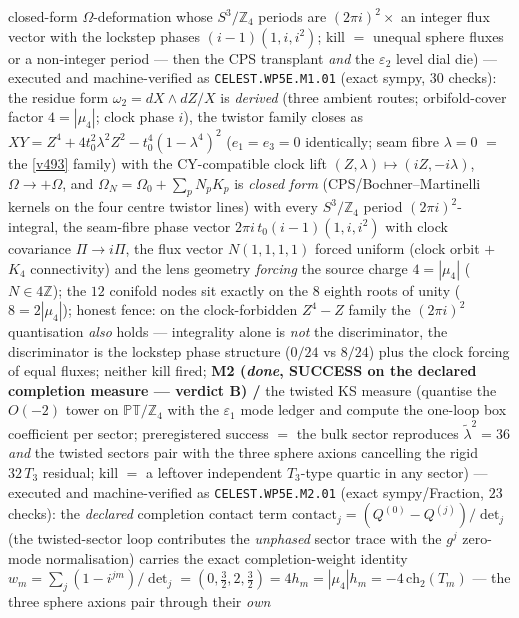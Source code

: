 \documentclass[11pt,a4paper]{article}
\newcommand{\Z}{\mathbb Z}
\begin{document}
\begin{itemize}
\begin{itemize}
closed-form $\Omega$-deformation whose $S^3/\Z_4$ periods are $(2\pi i)^2\times$ an integer flux
vector with the lockstep phases $(i-1)(1,i,i^2)$; kill $=$ unequal sphere fluxes or a
non-integer period --- then the CPS transplant \emph{and} the $\varepsilon_2$ level dial die) ---
executed and machine-verified as \texttt{CELEST.WP5E.M1.01}
 (exact sympy, $30$ checks): the residue form
$\omega_2=dX{\wedge}dZ/X$ is \emph{derived} (three ambient routes; orbifold-cover factor
$4=|\mu_4|$; clock phase $i$), the twistor family closes as
$XY=Z^4+4t_0^2\lambda^2Z^2-t_0^4(1-\lambda^4)^2$ ($e_1=e_3=0$ identically; seam fibre $\lambda=0$
$=$ the \vref{v493} family) with the CY-compatible clock lift
$(Z,\lambda)\mapsto(iZ,-i\lambda)$, $\Omega\to+\Omega$, and
$\Omega_N=\Omega_0+\sum_pN_pK_p$ is \emph{closed form} (CPS/Bochner--Martinelli kernels on the
four centre twistor lines) with every $S^3/\Z_4$ period $(2\pi i)^2$-integral, the seam-fibre
phase vector $2\pi i\,t_0(i-1)(1,i,i^2)$ with clock covariance $\Pi\to i\Pi$, the flux vector
$N(1,1,1,1)$ forced uniform (clock orbit $+$ $K_4$ connectivity) and the lens geometry
\emph{forcing} the source charge $4=|\mu_4|$ ($N\in4\Z$); the $12$ conifold nodes sit exactly on
the $8$ eighth roots of unity ($8=2|\mu_4|$); honest fence: on the clock-forbidden $Z^4-Z$
family the $(2\pi i)^2$ quantisation \emph{also} holds --- integrality alone is \emph{not} the
discriminator, the discriminator is the lockstep phase structure ($0/24$ vs $8/24$) plus the
clock forcing of equal fluxes; neither kill fired;
\textbf{M2 (\emph{done}, SUCCESS on the declared completion measure --- verdict B) \mE/\mC} the
twisted KS measure (quantise the $O(-2)$ tower on $\mathbb{PT}/\Z_4$ with the
$\varepsilon_1$ mode ledger and compute the one-loop box coefficient per sector; preregistered
success $=$ the bulk sector reproduces $\tilde\lambda^2=36$ \emph{and} the twisted sectors pair
with the three sphere axions cancelling the rigid $32\,T_3$ residual; kill $=$ a leftover
independent $T_3$-type quartic in any sector) --- executed and machine-verified as
\texttt{CELEST.WP5E.M2.01}  (exact
sympy/Fraction, $23$ checks): the \emph{declared} completion contact term
$\mathrm{contact}_j=(Q^{(0)}-Q^{(j)})/\det_j$ (the twisted-sector loop contributes the
\emph{unphased} sector trace with the $g^j$ zero-mode normalisation) carries the exact
completion-weight identity $w_m=\sum_j(1-i^{jm})/\det_j=(0,\tfrac32,2,\tfrac32)=4h_m=
|\mu_4|h_m=-4\,\mathrm{ch}_2(T_m)$ --- the three sphere axions pair through their \emph{own}

\end{itemize}
\end{itemize}
\end{document}
